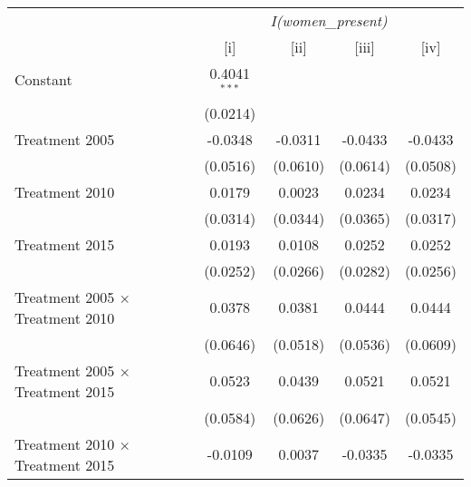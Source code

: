 
\begingroup
\centering
\begin{tabular}{lcccc}
   \toprule
    & \multicolumn{4}{c}{\textit{I(women\_present)}}\\
                                                                         & [i]            & [ii]          & [iii]         & [iv]\\  
   \midrule 
   Constant                                                              & 0.4041$^{***}$ &               &               &   \\   
                                                                         & (0.0214)       &               &               &   \\   
   Treatment 2005                                                        & -0.0348        & -0.0311       & -0.0433       & -0.0433\\   
                                                                         & (0.0516)       & (0.0610)      & (0.0614)      & (0.0508)\\   
   Treatment  2010                                                       & 0.0179         & 0.0023        & 0.0234        & 0.0234\\   
                                                                         & (0.0314)       & (0.0344)      & (0.0365)      & (0.0317)\\   
   Treatment 2015                                                        & 0.0193         & 0.0108        & 0.0252        & 0.0252\\   
                                                                         & (0.0252)       & (0.0266)      & (0.0282)      & (0.0256)\\   
   Treatment 2005 $ \times $ Treatment  2010                             & 0.0378         & 0.0381        & 0.0444        & 0.0444\\   
                                                                         & (0.0646)       & (0.0518)      & (0.0536)      & (0.0609)\\   
   Treatment 2005 $ \times $ Treatment 2015                              & 0.0523         & 0.0439        & 0.0521        & 0.0521\\   
                                                                         & (0.0584)       & (0.0626)      & (0.0647)      & (0.0545)\\   
   Treatment  2010 $ \times $ Treatment 2015                             & -0.0109        & 0.0037        & -0.0335       & -0.0335\\   

\end{tabular}
